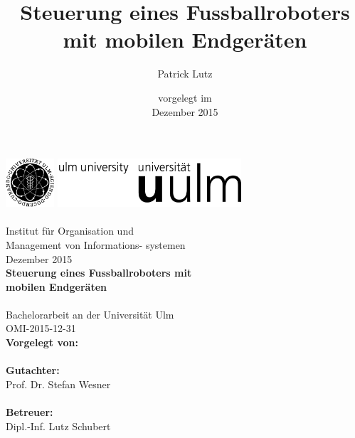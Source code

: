 \documentclass[BCOR20mm,DIV14,twoside,10pt,headinclude,footexclude,bibtotoc,liststotoc]{scrbook}
\title{Steuerung eines Fussballroboters mit mobilen Endgeräten} \let\thetitle\@title
\author{Patrick Lutz} \let\theauthor\@author
\date{
\footnotesize vorgelegt im\\
\normalsize Dezember 2015
}
\begin{document}
\frontmatter %
\thispagestyle{empty}

\newlength{\backup}
\setlength{\backup}{\headheight}

\includegraphics[height=1.8cm]{images/logo_100_sw_bildmarke}
\hfill
\includegraphics[height=1.8cm]{images/logo_100_sw_wortmarke}\\[1em]

{\footnotesize
{}\\
\hspace*{10.85cm}Institut für Organisation und\\
\hspace*{10.85cm}Management von Informations-
\hspace*{10.85cm}systemen\\[1em]
\hspace*{10.85cm}Dezember 2015\\[6em]
}
{\bfseries \huge Steuerung eines Fussballroboters mit \\ mobilen Endgeräten\\
}\\[0.5em]
{\large Bachelorarbeit an der Universität Ulm}\\[1em]
OMI-2015-12-31\\[4em]


{\large \bfseries Vorgelegt von:}\\                     
\theauthor \\[2em]
{\large \bfseries Gutachter:}\\                     
Prof. Dr. Stefan Wesner\\
\\[2em]
{\large \bfseries Betreuer:}\\ 
Dipl.-Inf. Lutz Schubert\\
\end{document}
